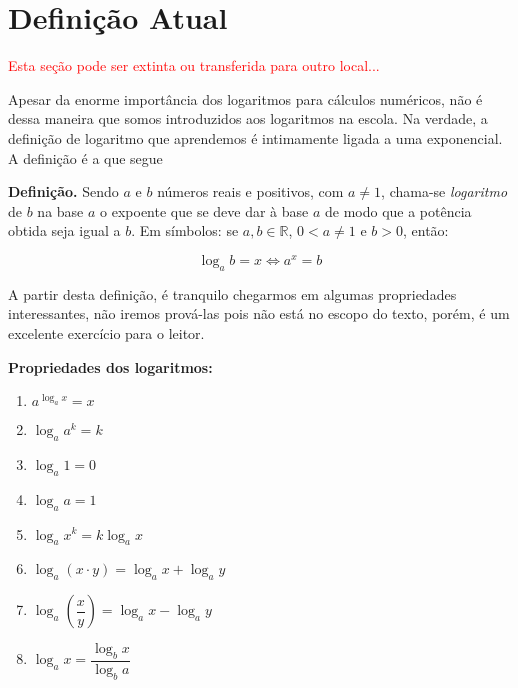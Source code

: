 \section{Definição Atual}

\textcolor{red}{Esta seção pode ser extinta ou transferida para outro local...}

Apesar da enorme importância dos logaritmos para cálculos numéricos, não é dessa maneira que somos introduzidos aos logaritmos na escola. Na verdade, a definição de logaritmo que aprendemos é intimamente ligada a uma exponencial. A definição é a que segue

\textbf{Definição.} Sendo $a$ e $b$ números reais e positivos, com $a \neq 1$, chama-se \textit{logaritmo} de $b$ na base $a$ o expoente que se deve dar à base $a$ de modo que a potência obtida seja igual a $b$.
Em símbolos: se $a, b \in \mathbb{R}$, $0 < a \neq 1$ e $b > 0$, então:

\[
\log_{a} b = x \iff a^x = b
\]

A partir desta definição, é tranquilo chegarmos em algumas propriedades interessantes, não iremos prová-las pois não está no escopo do texto, porém, é um excelente exercício para o leitor.


\noindent\textbf{Propriedades dos logaritmos:}

\begin{multicols}{2}
\begin{enumerate}
    \item ${a^{\log_a x} = x}$  
    \item ${\log_a a^k = k}$  
    \item ${\log_a 1 = 0}$ 
    \item ${\log_a a = 1}$ 
    \item ${\log_a x^k = k \log_a x}$ 
    \item ${\log_a(x\cdot y) = \log_a x + \log_a y}$ 
    \item ${\log_a\!\left(\dfrac{x}{y}\right) = \log_a x - \log_a y}$
    \item ${\log_a x = \dfrac{\log_b x}{\log_b a}}$ 
\end{enumerate}
\end{multicols}


